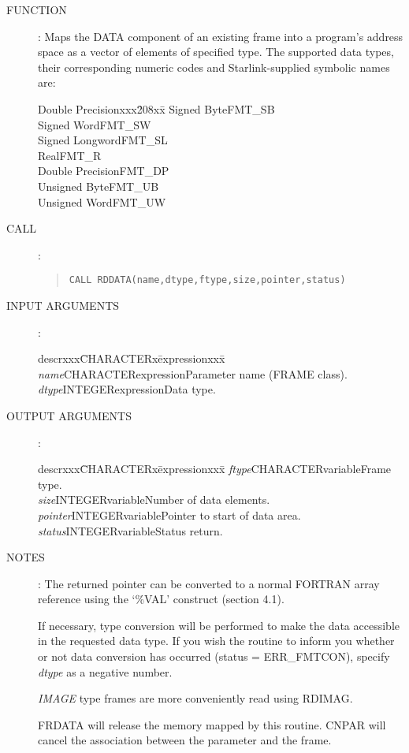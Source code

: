 \documentclass{article}
\begin{document}
\begin{description}
\item [FUNCTION]:
Maps the DATA component of an existing frame into a program's address space
as a vector of elements of specified type.
The supported data types, their corresponding numeric codes and
Starlink-supplied symbolic names are:
\begin{center}
\begin{tabbing}
Double Precisionxxx\=208xx\=\kill
Signed Byte\>FMT\_SB\\
Signed Word\>FMT\_SW\\
Signed Longword\>FMT\_SL\\
Real\>FMT\_R\\
Double Precision\>FMT\_DP\\
Unsigned Byte\>FMT\_UB\\
Unsigned Word\>FMT\_UW
\end{tabbing}
\end{center}
\item [CALL]:
\begin{quote}
{\tt CALL RDDATA(name,dtype,ftype,size,pointer,status)}
\end{quote}
\item [INPUT ARGUMENTS]:
\begin{tabbing}
descrxxx\=CHARACTERx\=expressionxxx\=\kill
{\em name}\>CHARACTER\>expression\>Parameter name (FRAME class).\\
{\em dtype}\>INTEGER\>expression\>Data type.
\end{tabbing}
\item [OUTPUT ARGUMENTS]:
\begin{tabbing}
descrxxx\=CHARACTERx\=expressionxxx\=\kill
{\em ftype}\>CHARACTER\>variable\>Frame type.\\
{\em size}\>INTEGER\>variable\>Number of data elements.\\
{\em pointer}\>INTEGER\>variable\>Pointer to start of data area.\\
{\em status}\>INTEGER\>variable\>Status return.
\end{tabbing}
\item [NOTES]:
The returned pointer can be converted to a normal FORTRAN array reference using
the `\%VAL' construct (section 4.1).

If necessary, type conversion will be performed to make the data accessible in
the requested data type.
If you wish the routine to inform you whether or not data conversion has
occurred (status = ERR\_FMTCON), specify {\em dtype} as a negative number.

{\em IMAGE} type frames are more conveniently read using RDIMAG.

FRDATA will release the memory mapped by this routine.
CNPAR will cancel the association between the parameter and the frame.
\end{description}
\end{document}
